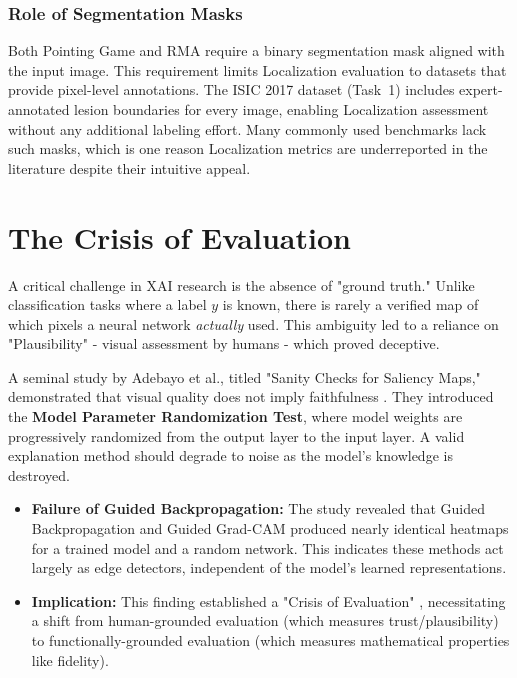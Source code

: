\subsubsection{Role of Segmentation Masks}
Both Pointing Game and RMA require a binary segmentation mask aligned with the input image. This requirement limits Localization evaluation to datasets that provide pixel-level annotations. The ISIC 2017 dataset (Task~1) includes expert-annotated lesion boundaries for every image, enabling Localization assessment without any additional labeling effort. Many commonly used benchmarks lack such masks, which is one reason Localization metrics are underreported in the literature despite their intuitive appeal.

\section{The Crisis of Evaluation}
\label{sec:crisis}

A critical challenge in XAI research is the absence of "ground truth." Unlike classification tasks where a label $y$ is known, there is rarely a verified map of which pixels a neural network \textit{actually} used. This ambiguity led to a reliance on "Plausibility" - visual assessment by humans - which proved deceptive.

A seminal study by Adebayo et al., titled "Sanity Checks for Saliency Maps," demonstrated that visual quality does not imply faithfulness \cite{adebayo2018sanity}. They introduced the \textbf{Model Parameter Randomization Test}, where model weights are progressively randomized from the output layer to the input layer. A valid explanation method should degrade to noise as the model's knowledge is destroyed.
\begin{itemize}
    \item \textbf{Failure of Guided Backpropagation:} The study revealed that Guided Backpropagation and Guided Grad-CAM produced nearly identical heatmaps for a trained model and a random network. This indicates these methods act largely as edge detectors, independent of the model's learned representations.
    \item \textbf{Implication:} This finding established a "Crisis of Evaluation" \cite{hedstrom2023quantus}, necessitating a shift from human-grounded evaluation (which measures trust/plausibility) to functionally-grounded evaluation (which measures mathematical properties like fidelity).
\end{itemize}

